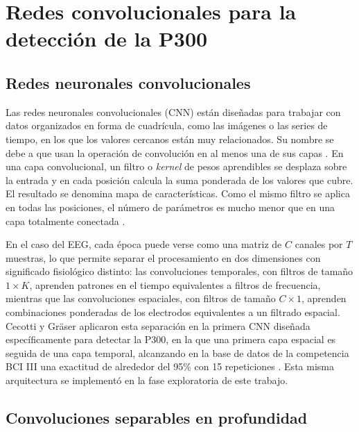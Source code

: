 \section[REDES CONVOLUCIONALES PARA LA DETECCIÓN DE LA P300]{Redes convolucionales para la
detección de la P300}
\label{sec:cnn}

\subsection{Redes neuronales convolucionales}

Las redes neuronales convolucionales (CNN) están diseñadas para trabajar con datos organizados en
forma de cuadrícula, como las imágenes o las series de tiempo, en los que los valores cercanos
están muy relacionados. Su nombre se debe a que usan la operación de convolución en al menos una de
sus capas \cite{goodfellow2016}. En una capa
convolucional, un filtro o \textit{kernel} de pesos aprendibles se desplaza sobre la entrada y en
cada posición calcula la suma ponderada de los valores que cubre. El resultado se denomina mapa
de características. Como el mismo filtro se aplica en todas las posiciones, el número de parámetros
es mucho menor que en una capa totalmente conectada \cite{aggarwal2018}.

En el caso del EEG, cada época puede verse como una matriz de $C$ canales por $T$ muestras, lo que
permite separar el procesamiento en dos dimensiones con significado fisiológico distinto: las
convoluciones temporales, con filtros de tamaño $1\times K$, aprenden patrones en el tiempo
equivalentes a filtros de frecuencia, mientras que las convoluciones espaciales, con filtros de
tamaño $C\times1$, aprenden combinaciones ponderadas de los electrodos equivalentes a un filtrado
espacial. Cecotti y Gräser aplicaron esta separación en la primera CNN diseñada específicamente para
detectar la P300, en la que una primera capa espacial es seguida de una capa temporal, alcanzando
en la base de datos de la competencia BCI III una exactitud de alrededor del 95\% con 15 repeticiones
\cite{cecotti2011}. Esta misma arquitectura se implementó en la fase exploratoria de este trabajo.

\subsection{Convoluciones separables en profundidad}

